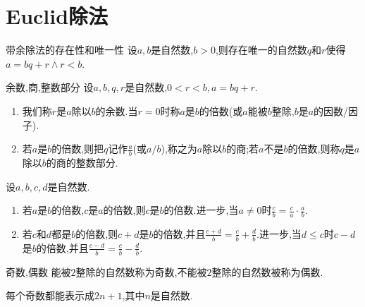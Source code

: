 \section{Euclid除法}

\begin{theorem}{带余除法的存在性和唯一性}{}
	设$a,b$是自然数,$b>0$,则存在唯一的自然数$q$和$r$使得$a=bq+r\wedge r<b$.
\end{theorem}

\begin{definition}{余数,商,整数部分}{}
	设$a,b,q,r$是自然数,$0<r<b,a=bq+r$.
	\begin{enumerate}
		\item 我们称$r$是$a$除以$b$的余数.当$r=0$时称$a$是$b$的倍数(或$a$能被$b$整除,$b$是$a$的因数/因子).
		\item 若$a$是$b$的倍数,则把$q$记作$\frac{a}{b}$(或$a/b$),称之为$a$除以$b$的商;若$a$不是$b$的倍数,则称$q$是$a$除以$b$的商的整数部分.
	\end{enumerate}
\end{definition}

\begin{proposition}{}{}
	设$a,b,c,d$是自然数.
	\begin{enumerate}
		\item 若$a$是$b$的倍数,$c$是$a$的倍数,则$c$是$b$的倍数.进一步,当$a\neq 0$时$\frac{c}{b}=\frac{c}{a}\cdot\frac{a}{b}$.
		\item 若$c$和$d$都是$b$的倍数,则$c+d$是$b$的倍数,并且$\frac{c+d}{b}=\frac{c}{b}+\frac{d}{b}$.进一步,当$d\leq c$时$c-d$是$b$的倍数,并且$\frac{c-d}{b}=\frac{c}{b}-\frac{d}{b}$.
	\end{enumerate}
\end{proposition}

\begin{definition}{奇数,偶数}{}
	能被$2$整除的自然数称为奇数,不能被$2$整除的自然数被称为偶数.
\end{definition}

\begin{corollary}{}{}
	每个奇数都能表示成$2n+1$,其中$n$是自然数.
\end{corollary}










































